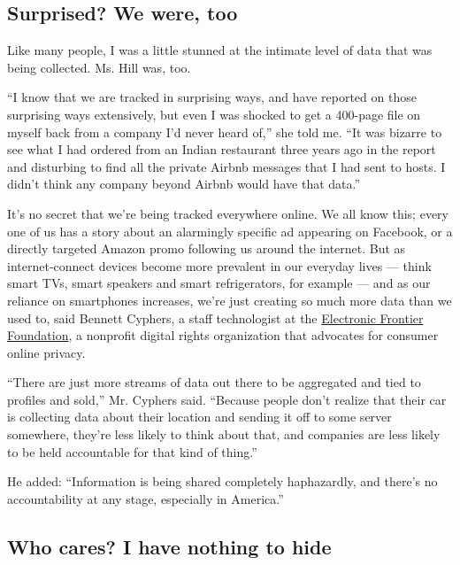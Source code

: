 \hypertarget{surprised-we-were-too}{%
\subsection{Surprised? We were, too}\label{surprised-we-were-too}}

Like many people, I was a little stunned at the intimate level of data
that was being collected. Ms. Hill was, too.

``I know that we are tracked in surprising ways, and have reported on
those surprising ways extensively, but even I was shocked to get a
400-page file on myself back from a company I'd never heard of,'' she
told me. ``It was bizarre to see what I had ordered from an Indian
restaurant three years ago in the report and disturbing to find all the
private Airbnb messages that I had sent to hosts. I didn't think any
company beyond Airbnb would have that data.''

It's no secret that we're being tracked everywhere online. We all know
this; every one of us has a story about an alarmingly specific ad
appearing on Facebook, or a directly targeted Amazon promo following us
around the internet. But as internet-connect devices become more
prevalent in our everyday lives --- think smart TVs, smart speakers and
smart refrigerators, for example --- and as our reliance on smartphones
increases, we're just creating so much more data than we used to, said
Bennett Cyphers, a staff technologist at the
\href{https://www.eff.org/}{Electronic Frontier Foundation}, a nonprofit
digital rights organization that advocates for consumer online privacy.

``There are just more streams of data out there to be aggregated and
tied to profiles and sold,'' Mr. Cyphers said. ``Because people don't
realize that their car is collecting data about their location and
sending it off to some server somewhere, they're less likely to think
about that, and companies are less likely to be held accountable for
that kind of thing.''

He added: ``Information is being shared completely haphazardly, and
there's no accountability at any stage, especially in America.''

\hypertarget{who-cares-i-have-nothing-to-hide}{%
\subsection{Who cares? I have nothing to
hide}\label{who-cares-i-have-nothing-to-hide}}

